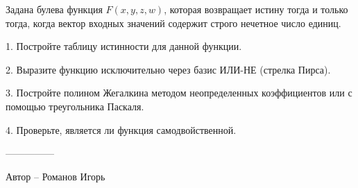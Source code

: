 \question
Задана булева функция $F(x,y,z,w)$, которая возвращает истину тогда и только тогда, когда вектор входных значений содержит строго нечетное число единиц.

1. Постройте таблицу истинности для данной функции.

2. Выразите функцию исключительно через базис ИЛИ-НЕ (стрелка Пирса).

3. Постройте полином Жегалкина методом неопределенных коэффициентов или с помощью треугольника Паскаля.

4. Проверьте, является ли функция самодвойственной.

---------------

Автор -- Романов Игорь